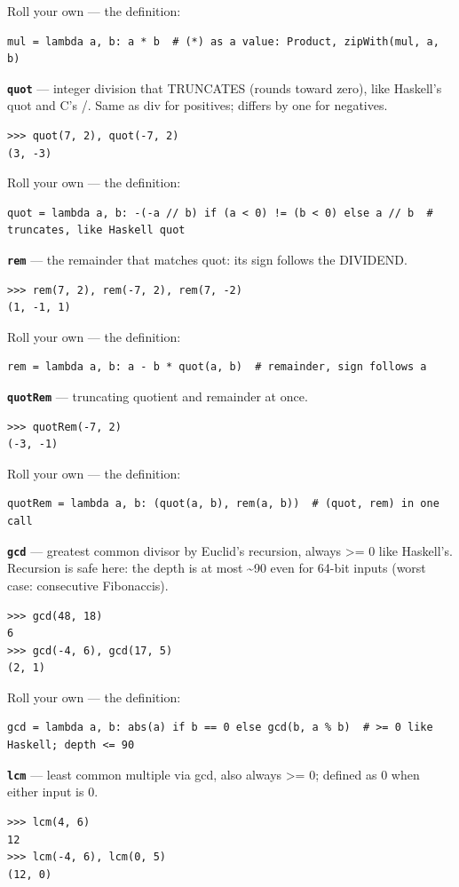 \documentclass[10pt,letterpaper]{article}
\begin{document}
Roll your own --- the definition:

\begin{lstlisting}[style=ex]
mul = lambda a, b: a * b  # (*) as a value: Product, zipWith(mul, a, b)
\end{lstlisting}
\textbf{\texttt{quot}} --- integer division that TRUNCATES (rounds toward zero), like Haskell's quot and C's /. Same as div for positives; differs by one for negatives.
\begin{lstlisting}[style=ex]
>>> quot(7, 2), quot(-7, 2)
(3, -3)
\end{lstlisting}

Roll your own --- the definition:

\begin{lstlisting}[style=ex]
quot = lambda a, b: -(-a // b) if (a < 0) != (b < 0) else a // b  # truncates, like Haskell quot
\end{lstlisting}
\textbf{\texttt{rem}} --- the remainder that matches quot: its sign follows the DIVIDEND.
\begin{lstlisting}[style=ex]
>>> rem(7, 2), rem(-7, 2), rem(7, -2)
(1, -1, 1)
\end{lstlisting}

Roll your own --- the definition:

\begin{lstlisting}[style=ex]
rem = lambda a, b: a - b * quot(a, b)  # remainder, sign follows a
\end{lstlisting}
\textbf{\texttt{quotRem}} --- truncating quotient and remainder at once.
\begin{lstlisting}[style=ex]
>>> quotRem(-7, 2)
(-3, -1)
\end{lstlisting}

Roll your own --- the definition:

\begin{lstlisting}[style=ex]
quotRem = lambda a, b: (quot(a, b), rem(a, b))  # (quot, rem) in one call
\end{lstlisting}
\textbf{\texttt{gcd}} --- greatest common divisor by Euclid's recursion, always >= 0 like Haskell's. Recursion is safe here: the depth is at most \~{}90 even for 64-bit inputs (worst case: consecutive Fibonaccis).
\begin{lstlisting}[style=ex]
>>> gcd(48, 18)
6
>>> gcd(-4, 6), gcd(17, 5)
(2, 1)
\end{lstlisting}

Roll your own --- the definition:

\begin{lstlisting}[style=ex]
gcd = lambda a, b: abs(a) if b == 0 else gcd(b, a % b)  # >= 0 like Haskell; depth <= 90
\end{lstlisting}
\textbf{\texttt{lcm}} --- least common multiple via gcd, also always >= 0; defined as 0 when either input is 0.
\begin{lstlisting}[style=ex]
>>> lcm(4, 6)
12
>>> lcm(-4, 6), lcm(0, 5)
(12, 0)
\end{lstlisting}
\end{document}
